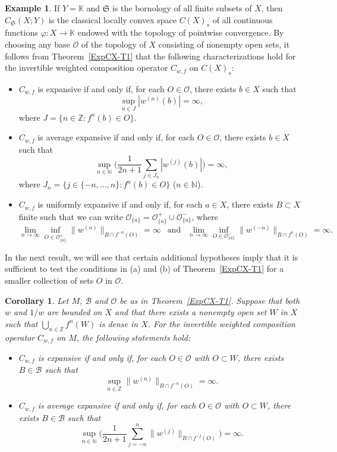 \documentclass[12pt]{article}
\theoremstyle{plain}
\newtheorem{corollary}[theorem]{Corollary}%
\theoremstyle{definition}
\newtheorem{example}[theorem]{Example}%
\newcommand{\N}{\mathbb{N}} %
\newcommand{\Z}{\mathbb{Z}} %
\newcommand{\K}{\mathbb{K}} %
\newcommand{\cB}{\mathcal{B}}
\newcommand{\cO}{\mathcal{O}}
\newcommand{\fS}{\mathfrak{S}}
\begin{document}
\begin{example}\label{ExpCX-Ex4}
If $Y = \K$ and $\fS$ is the bornology of all finite subsets of $X$, then $C_\fS(X;Y)$ is the classical locally convex space 
$C(X)_s$ of all continuous functions $\varphi : X \to \K$ endowed with the topology of pointwise convergence.
By choosing any base $\cO$ of the topology of $X$ consisting of nonempty open sets, it follows from Theorem~\ref{ExpCX-T1} that 
the following characterizations hold for the invertible weighted composition operator $C_{w,f}$ on $C(X)_s$:
\begin{itemize}
\item [\rm (a)] $C_{w,f}$ is expansive if and only if, for each $O \in \cO$, there exists $b \in X$ such that
    \[
    \sup_{n \in J} |w^{(n)}(b)| = \infty,
    \]
    where $J = \{n \in \Z : f^n(b) \in O\}$.
\item [\rm (b)] $C_{w,f}$ is average expansive if and only if, for each $O \in \cO$, there exists $b \in X$ such that
    \[
    \sup_{n \in \N} \Big(\frac{1}{2n+1} \sum_{j \in J_n} |w^{(j)}(b)|\Big) = \infty,
    \]
    where $J_n = \{j \in \{-n,\ldots,n\} : f^n(b) \in O\}$ ($n \in \N$).
\item [\rm (c)] $C_{w,f}$ is uniformly expansive if and only if, for each $a \in X$,
    there exists $B \subset X$ finite such that we can write $\cO_{\{a\}} = \cO_{\{a\}}^+ \cup \cO_{\{a\}}^-$, where
    \[
    \lim_{n \to \infty} \inf_{O \in \cO_{\{a\}}^+} \|w^{(n)}\|_{B \cap f^{-n}(O)} = \infty \ \ \text{ and } \ \ 
    \lim_{n \to \infty} \inf_{O \in \cO_{\{a\}}^-} \|w^{(-n)}\|_{B \cap f^{n}(O)} = \infty.
    \]
\end{itemize}
\end{example}

In the next result, we will see that certain additional hypotheses imply that it is sufficient to test the conditions in (a) and (b) 
of Theorem~\ref{ExpCX-T1} for a smaller collection of sets $O$ in $\cO$.

\begin{corollary}\label{ExpCX-C1}
Let $M$, $\cB$ and $\cO$ be as in Theorem~\ref{ExpCX-T1}. Suppose that both $w$ and $1/w$ are bounded on $X$ 
and that  there exists a nonempty open set $W$ in $X$ such that $\bigcup_{n \in \Z} f^n(W)$ is dense in $X$. 
For the invertible weighted composition operator $C_{w,f}$ on $M$, the following statements hold:
\begin{itemize}
\item [\rm (a)] $C_{w,f}$ is expansive if and only if, for each $O \in \cO$ with $O \subset W$, there exists $B \in \cB$ such that
    \[
    \sup_{n \in \Z} \|w^{(n)}\|_{B \cap f^{-n}(O)} = \infty.
    \]
\item [\rm (b)] $C_{w,f}$ is average expansive if and only if, for each $O \in \cO$ with $O \subset W$, there exists $B \in \cB$ such that
    \[
    \sup_{n \in \N} \Big(\frac{1}{2n+1} \sum_{j=-n}^n \|w^{(j)}\|_{B \cap f^{-j}(O)}\Big) = \infty.
    \]
\end{itemize}
\end{corollary}
\end{document}
